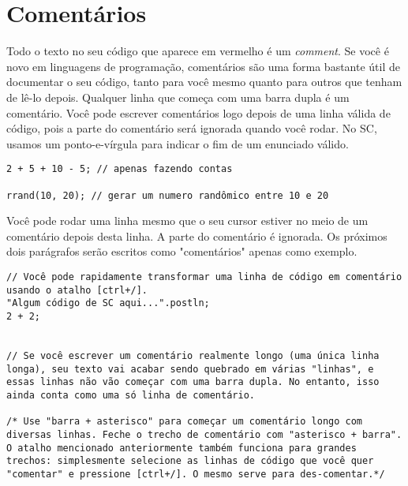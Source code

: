 \section{Comentários}

Todo o texto no seu código que aparece em vermelho é um \emph{comment}. Se você é novo em linguagens de programação, comentários são uma forma bastante útil de documentar o seu código, tanto para você mesmo quanto para outros que tenham de lê-lo depois. Qualquer linha que começa com uma barra dupla é um comentário. Você pode escrever comentários logo depois de uma linha válida de código, pois a parte do comentário será ignorada quando você rodar. No SC, usamos um ponto-e-vírgula para indicar o fim de um enunciado válido.

\begin{lstlisting}[style=SuperCollider-IDE, basicstyle=\scttfamily\footnotesize]
2 + 5 + 10 - 5; // apenas fazendo contas

rrand(10, 20); // gerar um numero randômico entre 10 e 20
\end{lstlisting}

Você pode rodar uma linha mesmo que o seu cursor estiver no meio de um comentário depois desta linha. A parte do comentário é ignorada. Os próximos dois parágrafos serão escritos como "comentários" apenas como exemplo.


 
\begin{lstlisting}[style=SuperCollider-IDE, basicstyle=\scttfamily\footnotesize]
// Você pode rapidamente transformar uma linha de código em comentário usando o atalho [ctrl+/].
"Algum código de SC aqui...".postln;
2 + 2;


// Se você escrever um comentário realmente longo (uma única linha longa), seu texto vai acabar sendo quebrado em várias "linhas", e essas linhas não vão começar com uma barra dupla. No entanto, isso ainda conta como uma só linha de comentário.

/* Use "barra + asterisco" para começar um comentário longo com diversas linhas. Feche o trecho de comentário com "asterisco + barra". O atalho mencionado anteriormente também funciona para grandes trechos: simplesmente selecione as linhas de código que você quer "comentar" e pressione [ctrl+/]. O mesmo serve para des-comentar.*/
\end{lstlisting}
